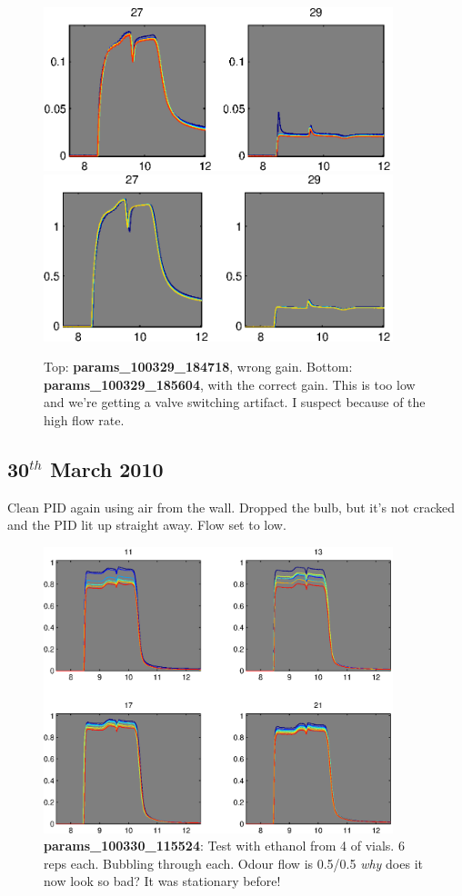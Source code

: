 \documentclass[a4paper]{report}
\begin{document}
\begin{figure}[h]
\centering
\includegraphics[width=4in]{params_100329_184718.eps}
\includegraphics[width=4in]{params_100329_185604.eps}
\caption{Top: \textbf{params\_100329\_184718}, wrong gain. Bottom:
  \textbf{params\_100329\_185604}, with the correct gain. This is too
  low and we're getting a valve switching artifact. I suspect because
  of the high flow rate.  }
\end{figure}







\clearpage
\subsection{30$^{th}$ March 2010}
Clean PID again using air from the wall. Dropped the bulb, but it's
not cracked and the PID lit up straight away. Flow set to low.
\begin{figure}[h]
\centering
\includegraphics[width=4in]{params_100330_115524.eps}
\caption{\textbf{params\_100330\_115524}:  Test with ethanol from 4
of vials. 6 reps each. Bubbling through each. Odour flow is 0.5/0.5
\textit{why} does it now look so bad? It was stationary before! }
\end{figure}
\end{document}
